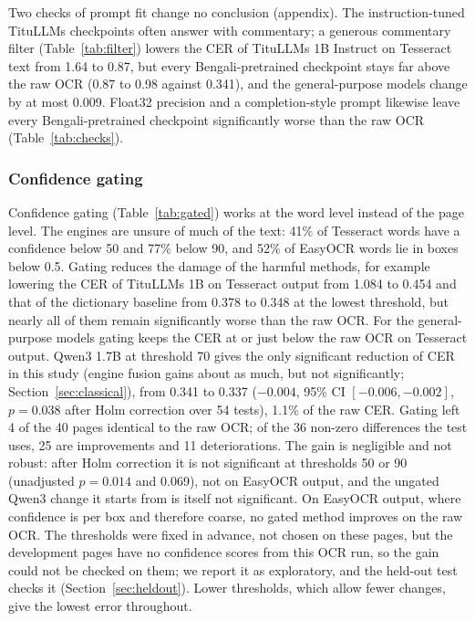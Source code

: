 \documentclass[conference]{IEEEtran}
\begin{document}


Two checks of prompt fit change no conclusion (appendix). The instruction-tuned TituLLMs checkpoints often answer with commentary; a generous commentary filter (Table~\ref{tab:filter}) lowers the CER of TituLLMs 1B Instruct on Tesseract text from 1.64 to 0.87, but every Bengali-pretrained checkpoint stays far above the raw OCR (0.87 to 0.98 against 0.341), and the general-purpose models change by at most 0.009. Float32 precision and a completion-style prompt likewise leave every Bengali-pretrained checkpoint significantly worse than the raw OCR (Table~\ref{tab:checks}).

\subsubsection{Confidence gating}
\label{sec:gating}
Confidence gating (Table~\ref{tab:gated}) works at the word level instead of the page level. The engines are unsure of much of the text: 41\% of Tesseract words have a confidence below 50 and 77\% below 90, and 52\% of EasyOCR words lie in boxes below 0.5. Gating reduces the damage of the harmful methods, for example lowering the CER of TituLLMs 1B on Tesseract output from 1.084 to 0.454 and that of the dictionary baseline from 0.378 to 0.348 at the lowest threshold, but nearly all of them remain significantly worse than the raw OCR. For the general-purpose models gating keeps the CER at or just below the raw OCR on Tesseract output. Qwen3 1.7B at threshold 70 gives the only significant reduction of CER in this study (engine fusion gains about as much, but not significantly; Section~\ref{sec:classical}), from 0.341 to 0.337 ($-0.004$, 95\% CI $[-0.006,-0.002]$, $p=0.038$ after Holm correction over 54 tests), 1.1\% of the raw CER. Gating left 4 of the 40 pages identical to the raw OCR; of the 36 non-zero differences the test uses, 25 are improvements and 11 deteriorations. The gain is negligible and not robust: after Holm correction it is not significant at thresholds 50 or 90 (unadjusted $p=0.014$ and 0.069), not on EasyOCR output, and the ungated Qwen3 change it starts from is itself not significant. On EasyOCR output, where confidence is per box and therefore coarse, no gated method improves on the raw OCR. The thresholds were fixed in advance, not chosen on these pages, but the development pages have no confidence scores from this OCR run, so the gain could not be checked on them; we report it as exploratory, and the held-out test checks it (Section~\ref{sec:heldout}). Lower thresholds, which allow fewer changes, give the lowest error throughout.
\end{document}
